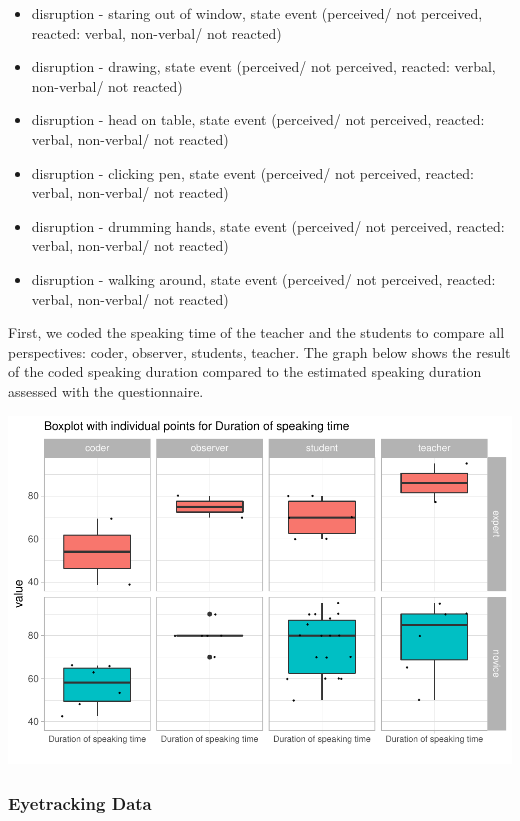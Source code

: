 \documentclass[
  english,
  man,floatsintext]{apa6}
\begin{document}
\begin{itemize}
\item
  disruption - staring out of window, state event (perceived/ not perceived, reacted: verbal, non-verbal/ not reacted)
\item
  disruption - drawing, state event (perceived/ not perceived, reacted: verbal, non-verbal/ not reacted)
\item
  disruption - head on table, state event (perceived/ not perceived, reacted: verbal, non-verbal/ not reacted)
\item
  disruption - clicking pen, state event (perceived/ not perceived, reacted: verbal, non-verbal/ not reacted)
\item
  disruption - drumming hands, state event (perceived/ not perceived, reacted: verbal, non-verbal/ not reacted)
\item
  disruption - walking around, state event (perceived/ not perceived, reacted: verbal, non-verbal/ not reacted)
\end{itemize}

First, we coded the speaking time of the teacher and the students to compare all perspectives: coder, observer, students, teacher. The graph below shows the result of the coded speaking duration compared to the estimated speaking duration assessed with the questionnaire.

\includegraphics{paper_1_supplement_new_table_files/figure-latex/speaking plot-1.pdf}

\hypertarget{eyetracking-data-1}{%
\subsubsection{Eyetracking Data}\label{eyetracking-data-1}}
\end{document}
